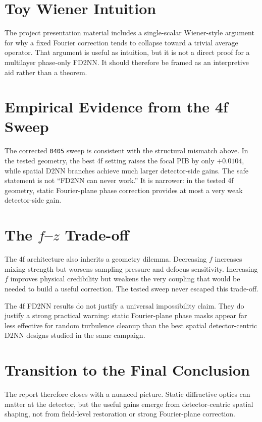 \section{Toy Wiener Intuition}

The project presentation material includes a single-scalar Wiener-style argument
for why a fixed Fourier correction tends to collapse toward a trivial average
operator. That argument is useful as intuition, but it is not a direct proof
for a multilayer phase-only FD2NN. It should therefore be framed as an
interpretive aid rather than a theorem.

\section{Empirical Evidence from the 4f Sweep}

The corrected \texttt{0405} sweep is consistent with the structural mismatch above. In
the tested geometry, the best 4f setting raises the focal PIB by only
$+0.0104$, while spatial D2NN branches achieve much larger detector-side gains.
The safe statement is not ``FD2NN can never work.'' It is narrower: in the
tested 4f geometry, static Fourier-plane phase correction provides at most a
very weak detector-side gain.

\section{The $f$--$z$ Trade-off}

The 4f architecture also inherits a geometry dilemma. Decreasing $f$ increases
mixing strength but worsens sampling pressure and defocus sensitivity.
Increasing $f$ improves physical credibility but weakens the very coupling that
would be needed to build a useful correction. The tested sweep never escaped
this trade-off.

\begin{discovery}
The 4f FD2NN results do not justify a universal impossibility claim. They do
justify a strong practical warning: static Fourier-plane phase masks appear far
less effective for random turbulence cleanup than the best spatial
detector-centric D2NN designs studied in the same campaign.
\end{discovery}

\section{Transition to the Final Conclusion}

The report therefore closes with a nuanced picture. Static diffractive optics
can matter at the detector, but the useful gains emerge from detector-centric
spatial shaping, not from field-level restoration or strong Fourier-plane
correction.
